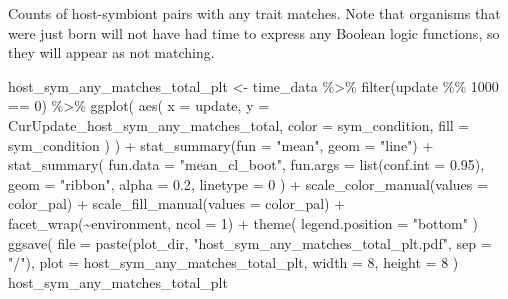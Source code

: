 \documentclass[
]{book}
\newenvironment{Shaded}{\begin{snugshade}}{\end{snugshade}}
\newcommand{\AttributeTok}[1]{\textcolor[rgb]{0.77,0.63,0.00}{#1}}
\newcommand{\DecValTok}[1]{\textcolor[rgb]{0.00,0.00,0.81}{#1}}
\newcommand{\FloatTok}[1]{\textcolor[rgb]{0.00,0.00,0.81}{#1}}
\newcommand{\FunctionTok}[1]{\textcolor[rgb]{0.00,0.00,0.00}{#1}}
\newcommand{\NormalTok}[1]{#1}
\newcommand{\OtherTok}[1]{\textcolor[rgb]{0.56,0.35,0.01}{#1}}
\newcommand{\SpecialCharTok}[1]{\textcolor[rgb]{0.00,0.00,0.00}{#1}}
\newcommand{\StringTok}[1]{\textcolor[rgb]{0.31,0.60,0.02}{#1}}
\begin{document}
Counts of host-symbiont pairs with any trait matches.
Note that organisms that were just born will not have had time to express any
Boolean logic functions, so they will appear as not matching.

\begin{Shaded}
\begin{Highlighting}[]
\NormalTok{host\_sym\_any\_matches\_total\_plt }\OtherTok{\textless{}{-}}\NormalTok{ time\_data }\SpecialCharTok{\%\textgreater{}\%}
  \FunctionTok{filter}\NormalTok{(update }\SpecialCharTok{\%\%} \DecValTok{1000} \SpecialCharTok{==} \DecValTok{0}\NormalTok{) }\SpecialCharTok{\%\textgreater{}\%}
  \FunctionTok{ggplot}\NormalTok{(}
    \FunctionTok{aes}\NormalTok{(}
      \AttributeTok{x =}\NormalTok{ update,}
      \AttributeTok{y =}\NormalTok{ CurUpdate\_host\_sym\_any\_matches\_total,}
      \AttributeTok{color =}\NormalTok{ sym\_condition,}
      \AttributeTok{fill =}\NormalTok{ sym\_condition}
\NormalTok{    )}
\NormalTok{  ) }\SpecialCharTok{+}
  \FunctionTok{stat\_summary}\NormalTok{(}\AttributeTok{fun =} \StringTok{"mean"}\NormalTok{, }\AttributeTok{geom =} \StringTok{"line"}\NormalTok{) }\SpecialCharTok{+}
  \FunctionTok{stat\_summary}\NormalTok{(}
    \AttributeTok{fun.data =} \StringTok{"mean\_cl\_boot"}\NormalTok{,}
    \AttributeTok{fun.args =} \FunctionTok{list}\NormalTok{(}\AttributeTok{conf.int =} \FloatTok{0.95}\NormalTok{),}
    \AttributeTok{geom =} \StringTok{"ribbon"}\NormalTok{,}
    \AttributeTok{alpha =} \FloatTok{0.2}\NormalTok{,}
    \AttributeTok{linetype =} \DecValTok{0}
\NormalTok{  ) }\SpecialCharTok{+}
  \FunctionTok{scale\_color\_manual}\NormalTok{(}\AttributeTok{values =}\NormalTok{ color\_pal) }\SpecialCharTok{+}
  \FunctionTok{scale\_fill\_manual}\NormalTok{(}\AttributeTok{values =}\NormalTok{ color\_pal) }\SpecialCharTok{+}
  \FunctionTok{facet\_wrap}\NormalTok{(}\SpecialCharTok{\textasciitilde{}}\NormalTok{environment, }\AttributeTok{ncol =} \DecValTok{1}\NormalTok{) }\SpecialCharTok{+}
  \FunctionTok{theme}\NormalTok{(}
    \AttributeTok{legend.position =} \StringTok{"bottom"}
\NormalTok{  )}
\FunctionTok{ggsave}\NormalTok{(}
  \AttributeTok{file =} \FunctionTok{paste}\NormalTok{(plot\_dir, }\StringTok{"host\_sym\_any\_matches\_total\_plt.pdf"}\NormalTok{, }\AttributeTok{sep =} \StringTok{"/"}\NormalTok{),}
  \AttributeTok{plot =}\NormalTok{ host\_sym\_any\_matches\_total\_plt,}
  \AttributeTok{width =} \DecValTok{8}\NormalTok{,}
  \AttributeTok{height =} \DecValTok{8}
\NormalTok{)}
\NormalTok{host\_sym\_any\_matches\_total\_plt}
\end{Highlighting}
\end{Shaded}
\end{document}
